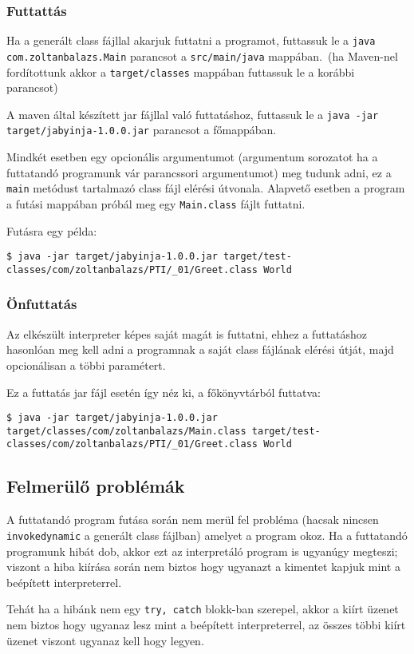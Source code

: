 \subsubsection{Futtattás}

Ha a generált class fájllal akarjuk futtatni a programot, futtassuk le a \lstinline{java com.zoltanbalazs.Main} parancsot a \lstinline{src/main/java} mappában.\ (ha Maven-nel fordítottunk akkor a \lstinline{target/classes} mappában futtassuk le a korábbi parancsot)

A maven által készített jar fájllal való futtatáshoz, futtassuk le a \lstinline{java -jar target/jabyinja-1.0.0.jar} parancsot a főmappában.

Mindkét esetben egy opcionális argumentumot (argumentum sorozatot ha a futtatandó programunk vár parancssori argumentumot) meg tudunk adni, ez a \lstinline{main} metódust tartalmazó class fájl elérési útvonala. Alapvető esetben a program a futási mappában próbál meg egy \lstinline{Main.class} fájlt futtatni.

Futásra egy példa:
\begin{verbatim}
$ java -jar target/jabyinja-1.0.0.jar target/test-classes/com/zoltanbalazs/PTI/_01/Greet.class World
\end{verbatim}

\subsubsection{Önfuttatás}

Az elkészült interpreter képes saját magát is futtatni, ehhez a futtatáshoz hasonlóan meg kell adni a programnak a saját class fájlának elérési útját, majd opcionálisan a többi paramétert.

Ez a futtatás jar fájl esetén így néz ki, a főkönyvtárból futtatva:
\begin{verbatim}
$ java -jar target/jabyinja-1.0.0.jar target/classes/com/zoltanbalazs/Main.class target/test-classes/com/zoltanbalazs/PTI/_01/Greet.class World
\end{verbatim}

\subsection{Felmerülő problémák}

A futtatandó program futása során nem merül fel probléma (hacsak nincsen \lstinline{invokedynamic} a generált class fájlban) amelyet a program okoz. Ha a futtatandó programunk hibát dob, akkor ezt az interpretáló program is ugyanúgy megteszi; viszont a hiba kiírása során nem biztos hogy ugyanazt a kimentet kapjuk mint a beépített interpreterrel.

Tehát ha a hibánk nem egy \lstinline{try, catch} blokk-ban szerepel, akkor a kiírt üzenet nem biztos hogy ugyanaz lesz mint a beépített interpreterrel, az összes többi kiírt üzenet viszont ugyanaz kell hogy legyen.
